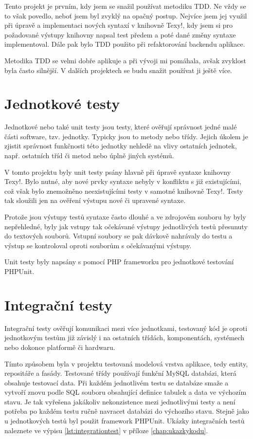 \documentclass[11pt,twoside,a4paper]{book}
\begin{document}
Tento projekt je prvním, kdy jsem se snažil používat metodiku TDD. Ne vždy se to však povedlo, neboť jsem byl zvyklý na opačný postup. Nejvíce jsem jej využil při úpravě a implementaci nových syntaxí v knihovně Texy!, kdy jsem si pro požadované výstupy knihovny napsal test předem a poté dané změny syntaxe implementoval. Dále pak bylo TDD použito při refaktorování backendu aplikace.

Metodika TDD se velmi dobře aplikuje a při vývoji mi pomáhala, avšak zvyklost byla často silnější. V dalších projektech se budu snažit používat ji ještě více.


\section{Jednotkové testy}
Jednotkové nebo také unit testy jsou testy, které ověřují správnost jedné malé části software, tzv. jednotky. Typicky jsou to metody nebo třídy. Jejich úkolem je zjistit správnost funkčnosti této jednotky nehledě na vlivy ostatních jednotek, např. ostatních tříd či metod nebo úplně jiných systémů.

V tomto projektu byly unit testy psány hlavně při úpravě syntaxe knihovny Texy!. Bylo nutné, aby nové prvky syntaxe nebyly v konfliktu s již existujícími, což však bylo znemožněno neexistujícími testy v samotné knihovně Texy!. Testy tak sloužili jen na ověření výstupu nové či upravené syntaxe.

Protože jsou výstupy testů syntaxe často dlouhé a ve zdrojovém souboru by byly nepřehledné, byly jak vstupy tak očekávané výstupy jednotlivých testů přesunuty do textových souborů. Vstupní soubory se pak dávkově nahrávaly do testu a výstup se kontroloval oproti souborům s očekávanými výstupy.

Unit testy byly napsány s pomocí PHP frameworku pro jednotkové testování PHPUnit\cite{phpunit}.


\section{Integrační testy}
Integrační testy ověřují komunikaci mezi více jednotkami, testovaný kód je oproti jednotkovým testům již závislý i na ostatních třídách, komponentách, systémech nebo dokonce platformě či hardwaru.

Tímto způsobem byla v projektu testovaná modelová vrstva aplikace, tedy entity, repositáře a fasády. Testované třídy používají funkční MySQL databázi, která obsahuje testovací data. Při každém jednotlivém testu se databáze smaže a vytvoří znovu podle SQL souboru obsahující definice tabulek a data ve výchozím stavu. Je tak vyřešena jakákoliv nekonzistence mezi jednotlivými testy a není potřeba po každém testu ručně navracet databázi do výchozího stavu. Stejně jako u jednotkových testů byl použit framework PHPUnit. Ukázky integračních testů naleznete ve výpisu \ref{lst:integrationtest} v příloze \ref{chap:ukazkykodu}.
\end{document}
